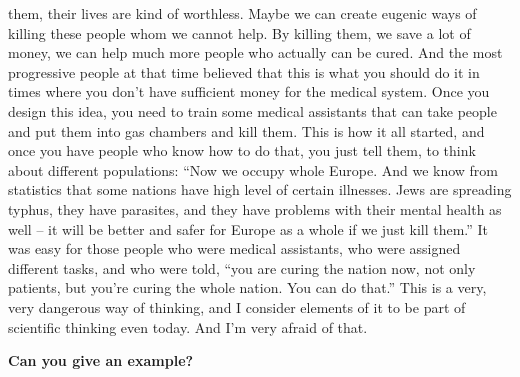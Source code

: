 them, their lives are kind of worthless. Maybe we can create eugenic ways of killing these people whom we cannot help. By killing them, we save a lot of money, we can help much more people who actually can be cured. And the most progressive people at that time believed that this is what you should do it in times where you don’t have sufficient money for the medical system. Once you design this idea, you need to train some medical assistants that can take people and put them into gas chambers and kill them. This is how it all started, and once you have people who know how to do that, you just tell them, to think about different populations: ``Now we occupy whole Europe. And we know from statistics that some nations have high level of certain illnesses. Jews are spreading typhus, they have parasites, and they have problems with their mental health as well – it will be better and safer for Europe as a whole if we just kill them.'' It was easy for those people who were medical assistants, who were assigned different tasks, and who were told, “you are curing the nation now, not only patients, but you’re curing the whole nation. You can do that.” This is a very, very dangerous way of thinking, and I consider elements of it to be part of scientific thinking even today. And I’m very afraid of that.

\textbf{Can you give an example?} 

